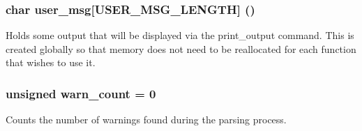 \subsubsection{\setlength{\rightskip}{0pt plus 5cm}char {\bf user\_\-msg}[USER\_\-MSG\_\-LENGTH] ()}\label{parser__misc_8c_a0}


Holds some output that will be displayed via the print\_\-output command. This is created globally so that memory does not need to be reallocated for each function that wishes to use it. 
\subsubsection{\setlength{\rightskip}{0pt plus 5cm}unsigned {\bf warn\_\-count} = 0}\label{parser__misc_8c_a2}


Counts the number of warnings found during the parsing process. 
